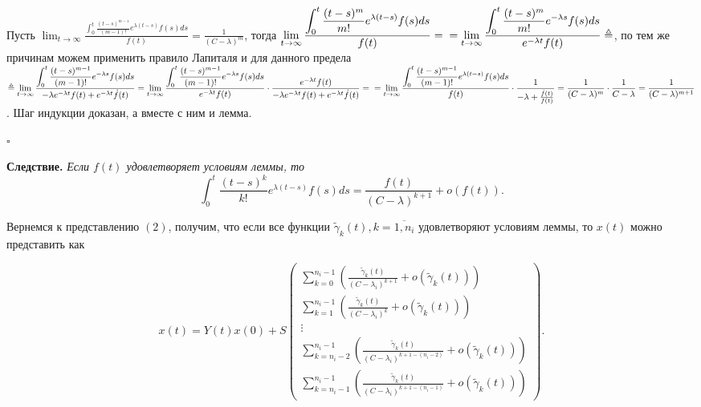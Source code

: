 \documentclass[12pt, a4paper]{article}
\begin{document}
\quad Пусть $\displaystyle\lim_{t \rightarrow \infty} \frac{\displaystyle\int_0^t\frac{(t-s)^{m-1}}{(m-1)!} e^{\lambda (t-s)}f(s)ds}{f(t)} = \frac{1}{(C-\lambda)^m}$, тогда $\displaystyle\lim_{t \rightarrow \infty} \frac{\displaystyle\int_0^t\frac{(t-s)^{m}}{m!} e^{\lambda (t-s)}f(s)ds}{f(t)} = \\ = \lim_{t \rightarrow \infty} \frac{\displaystyle\int_0^t\frac{(t-s)^{m}}{m!} e^{-\lambda s}f(s)ds}{e^{-\lambda t}f(t)} \triangleq$, по тем же причинам можем применить правило Лапиталя и для данного предела $\triangleq \displaystyle\lim_{t \rightarrow \infty} \frac{\displaystyle\int_0^t\frac{(t-s)^{m-1}}{(m-1)!} e^{-\lambda s}f(s)ds}{-\lambda e^{-\lambda t}f(t) + e^{-\lambda t}\dot{f}(t)} = \lim_{t \rightarrow \infty} \frac{\displaystyle\int_0^t\frac{(t-s)^{m-1}}{(m-1)!} e^{-\lambda s}f(s)ds}{e^{-\lambda t}f(t)} \cdot \frac{e^{-\lambda t}f(t)}{-\lambda e^{-\lambda t}f(t) + e^{-\lambda t}\dot{f}(t)} = \\ = \lim_{t \rightarrow \infty} \frac{\displaystyle\int_0^t\frac{(t-s)^{m-1}}{(m-1)!} e^{\lambda (t-s)}f(s)ds}{f(t)}\cdot \frac{1}{-\lambda + \frac{\dot{f}(t)}{f(t)}} = \frac{1}{(C-\lambda)^m} \cdot \frac{1}{C-\lambda} = \frac{1}{(C-\lambda)^{m+1}}$. Шаг индукции доказан, а вместе с ним и лемма.
\begin{flushright} $\square$ \end{flushright}

\newpage

\quad \textbf{Следствие.}  \textit{Если $f(t)$ удовлетворяет условиям леммы, то}
\[\displaystyle\int_0^t\frac{(t-s)^k}{k!} e^{\lambda (t-s)}f(s)ds = \frac{f(t)}{(C-\lambda)^{k+1}} + o(f(t)).\]

\quad Вернемся к представлению $(2)$, получим, что если все функции $\widetilde{\gamma}_k(t), k = \overline{1,n_i}$ удовлетворяют условиям леммы, то $x(t)$ можно представить как 

\[
x(t) = Y(t)x(0) + S
\left(
\begin{array}{c}
\displaystyle \sum_{k=0}^{n_i - 1}\left(\frac{\widetilde{\gamma}_k(t)}{(C-\lambda_i)^{k+1}} + o(\widetilde{\gamma}_k(t))\right) \\
\displaystyle \sum_{k=1}^{n_i - 1}\left(\frac{\widetilde{\gamma}_k(t)}{(C-\lambda_i)^{k}} + o(\widetilde{\gamma}_k(t))\right) \\
\vdots \\
\displaystyle \sum_{k=n_i-2}^{n_i - 1}\left(\frac{\widetilde{\gamma}_k(t)}{(C-\lambda_i)^{k+1-(n_i-2)}} + o(\widetilde{\gamma}_k(t))\right) \\
\displaystyle \sum_{k=n_i-1}^{n_i - 1}\left(\frac{\widetilde{\gamma}_k(t)}{(C-\lambda_i)^{k+1-(n_i-1)}} + o(\widetilde{\gamma}_k(t))\right)
\end{array}
\right)
.
\]
\end{document}
